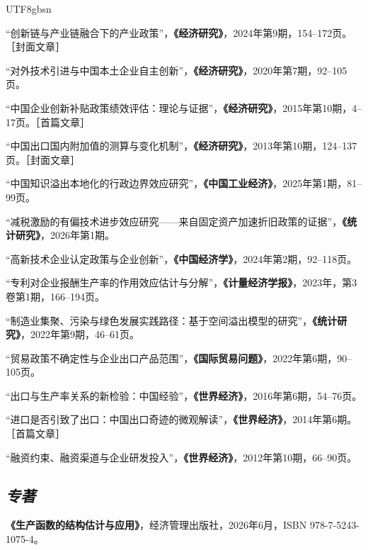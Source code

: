 \documentclass[letterpaper]{article}
\begin{document}
\begin{CJK}{UTF8}{gbsn}
\begin{papers}
\item “创新链与产业链融合下的产业政策”，\textbf{《经济研究》}，2024年第9期，154--172页。［封面文章］

\item “对外技术引进与中国本土企业自主创新”，\textbf{《经济研究》}，2020年第7期，92--105页。

\item “中国企业创新补贴政策绩效评估：理论与证据”，\textbf{《经济研究》}，2015年第10期，4--17页。［首篇文章］

\item “中国出口国内附加值的测算与变化机制”，\textbf{《经济研究》}，2013年第10期，124--137页。［封面文章］

\item “中国知识溢出本地化的行政边界效应研究”，\textbf{《中国工业经济》}，2025年第1期，81--99页。

\item “减税激励的有偏技术进步效应研究——来自固定资产加速折旧政策的证据”，\textbf{《统计研究》}，2026年第1期。

\item “高新技术企业认定政策与企业创新”，\textbf{《中国经济学》}，2024年第2期，92--118页。

\item “专利对企业报酬生产率的作用效应估计与分解”，\textbf{《计量经济学报》}，2023年，第3卷第1期，166--194页。

\item “制造业集聚、污染与绿色发展实践路径：基于空间溢出模型的研究”，\textbf{《统计研究》}，2022年第9期，46--61页。

\item “贸易政策不确定性与企业出口产品范围”，\textbf{《国际贸易问题》}，2022年第6期，90--105页。

\item “出口与生产率关系的新检验：中国经验”，\textbf{《世界经济》}，2016年第6期，54--76页。

\item “进口是否引致了出口：中国出口奇迹的微观解读”，\textbf{《世界经济》}，2014年第6期。［首篇文章］

\item “融资约束、融资渠道与企业研发投入”，\textbf{《世界经济》}，2012年第10期，66--90页。
\end{papers}

\subsection*{\textit{专著}}
\textbf{《生产函数的结构估计与应用》}，经济管理出版社，2026年6月，ISBN 978-7-5243-1075-4。


\end{CJK}
\end{document}
